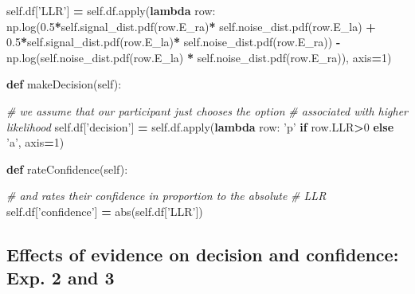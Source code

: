 \documentclass[12pt,twoside]{reedthesis}
\newenvironment{Shaded}{\begin{snugshade}}{\end{snugshade}}
\newcommand{\BuiltInTok}[1]{#1}
\newcommand{\CommentTok}[1]{\textcolor[rgb]{0.56,0.35,0.01}{\textit{#1}}}
\newcommand{\ControlFlowTok}[1]{\textcolor[rgb]{0.13,0.29,0.53}{\textbf{#1}}}
\newcommand{\DecValTok}[1]{\textcolor[rgb]{0.00,0.00,0.81}{#1}}
\newcommand{\FloatTok}[1]{\textcolor[rgb]{0.00,0.00,0.81}{#1}}
\newcommand{\KeywordTok}[1]{\textcolor[rgb]{0.13,0.29,0.53}{\textbf{#1}}}
\newcommand{\NormalTok}[1]{#1}
\newcommand{\OperatorTok}[1]{\textcolor[rgb]{0.81,0.36,0.00}{\textbf{#1}}}
\newcommand{\StringTok}[1]{\textcolor[rgb]{0.31,0.60,0.02}{#1}}
\newcommand{\VariableTok}[1]{\textcolor[rgb]{0.00,0.00,0.00}{#1}}
\begin{document}
\begin{Shaded}
\begin{Highlighting}[]
        \VariableTok{self}\NormalTok{.df[}\StringTok{'LLR'}\NormalTok{] }\OperatorTok{=} \VariableTok{self}\NormalTok{.df.}\BuiltInTok{apply}\NormalTok{(}\KeywordTok{lambda}\NormalTok{ row: }
\NormalTok{               np.log(}\FloatTok{0.5}\OperatorTok{*}\VariableTok{self}\NormalTok{.signal_dist.pdf(row.E_ra)}\OperatorTok{*} 
               \VariableTok{self}\NormalTok{.noise_dist.pdf(row.E_la) }\OperatorTok{+} 
               \FloatTok{0.5}\OperatorTok{*}\VariableTok{self}\NormalTok{.signal_dist.pdf(row.E_la)}\OperatorTok{*} 
               \VariableTok{self}\NormalTok{.noise_dist.pdf(row.E_ra)) }\OperatorTok{-} 
\NormalTok{               np.log(}\VariableTok{self}\NormalTok{.noise_dist.pdf(row.E_la) }\OperatorTok{*} 
               \VariableTok{self}\NormalTok{.noise_dist.pdf(row.E_ra)), }
\NormalTok{               axis}\OperatorTok{=}\DecValTok{1}\NormalTok{)}
               
    \KeywordTok{def}\NormalTok{ makeDecision(}\VariableTok{self}\NormalTok{):}
        
        \CommentTok{# we assume that our participant just chooses the option }
        \CommentTok{# associated with higher likelihood}
        \VariableTok{self}\NormalTok{.df[}\StringTok{'decision'}\NormalTok{] }\OperatorTok{=}  \VariableTok{self}\NormalTok{.df.}\BuiltInTok{apply}\NormalTok{(}\KeywordTok{lambda}\NormalTok{ row: }
               \StringTok{'p'} \ControlFlowTok{if}\NormalTok{ row.LLR}\OperatorTok{>}\DecValTok{0} 
                \ControlFlowTok{else} \StringTok{'a'}\NormalTok{, }
\NormalTok{                axis}\OperatorTok{=}\DecValTok{1}\NormalTok{)}
        
    \KeywordTok{def}\NormalTok{ rateConfidence(}\VariableTok{self}\NormalTok{):}
        
        \CommentTok{# and rates their confidence in proportion to the absolute}
        \CommentTok{# LLR}
        \VariableTok{self}\NormalTok{.df[}\StringTok{'confidence'}\NormalTok{] }\OperatorTok{=} \BuiltInTok{abs}\NormalTok{(}\VariableTok{self}\NormalTok{.df[}\StringTok{'LLR'}\NormalTok{])}
\end{Highlighting}
\end{Shaded}
\hypertarget{effects-of-evidence-on-decision-and-confidence-exp.-2-and-3}{%
\subsection{Effects of evidence on decision and confidence: Exp. 2 and 3}\label{effects-of-evidence-on-decision-and-confidence-exp.-2-and-3}}
\end{document}
